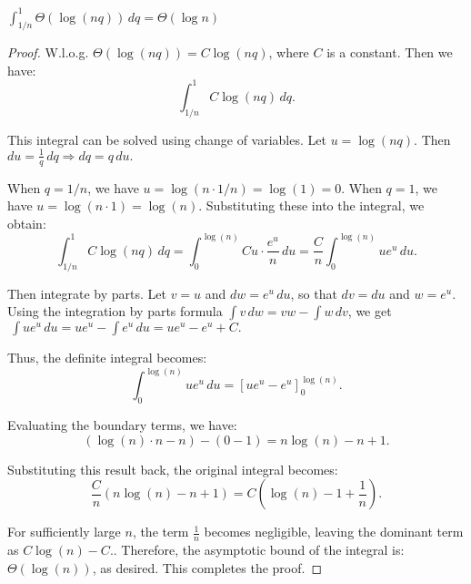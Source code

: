 \begin{lemma}\label{lem:logInt}
    \(\int_{1/n}^{1} \Theta(\log(nq)) \, dq = \Theta(\log n)\) 
\end{lemma}
\begin{proof}
    W.l.o.g. \(\Theta(\log(nq)) = C \log(nq)\), where \(C\) is a constant. Then we have:
    \[
    \int_{1/n}^{1} C \log(nq) \, dq.
    \]

This integral can be solved using change of variables. Let \(u = \log(nq)\). Then \( du = \frac{1}{q} \, dq \Rightarrow dq = q \, du.\)

When \(q = 1/n\), we have \(u = \log(n \cdot 1/n) = \log(1) = 0\). When \(q = 1\), we have \(u = \log(n \cdot 1) = \log(n)\). Substituting these into the integral, we obtain:
\[
\int_{1/n}^{1} C \log(nq) \, dq = \int_{0}^{\log(n)} C u \cdot \frac{e^u}{n} \, du = \frac{C}{n} \int_{0}^{\log(n)} u e^u \, du.
\]

Then integrate by parts. Let \(v = u\) and \(dw = e^u \, du\), so that \(dv = du\) and \(w = e^u\). Using the integration by parts formula \(\int v \, dw = vw - \int w \, dv\), we get \(\
\int u e^u \, du = u e^u - \int e^u \, du = u e^u - e^u + C.\)

Thus, the definite integral becomes:
\[
\int_{0}^{\log(n)} u e^u \, du = \left[ u e^u - e^u \right]_{0}^{\log(n)}.
\]

Evaluating the boundary terms, we have:
\[
\left( \log(n) \cdot n - n \right) - (0 - 1) = n \log(n) - n + 1.
\]

Substituting this result back, the original integral becomes:
\[
\frac{C}{n} (n \log(n) - n + 1) = C (\log(n) - 1 + \frac{1}{n}).
\]

For sufficiently large \(n\), the term \(\frac{1}{n}\) becomes negligible, leaving the dominant term as 
\(
C \log(n) - C.
\). Therefore, the asymptotic bound of the integral is:
\(
\Theta(\log(n))
\), as desired. This completes the proof.
\end{proof}

